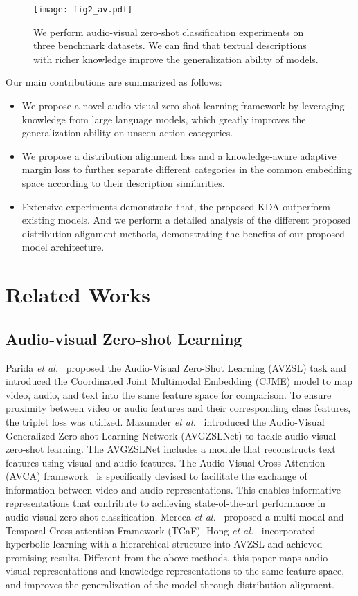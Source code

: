 \documentclass[10pt,twocolumn,letterpaper]{article}
\begin{document}
\begin{figure}[t]
\centering
\texttt{[image: fig2\_av.pdf]}
	\caption{We perform audio-visual zero-shot classification experiments on three benchmark datasets. We can find that textual descriptions with richer knowledge improve the generalization ability of models.}
	\label{fig2}
\end{figure}

Our main contributions are summarized as follows:
\begin{itemize}
    \item We propose a novel audio-visual zero-shot learning framework by leveraging knowledge from large language models, which greatly improves the generalization ability on unseen action categories.
    \item We propose a distribution alignment loss and a knowledge-aware adaptive margin loss to further separate different categories in the common embedding space according to their description similarities.
    \item Extensive experiments demonstrate that, the proposed KDA outperform existing models. And we perform a detailed analysis of the different proposed distribution alignment methods, demonstrating the benefits of our proposed model architecture.
    
\end{itemize}




\section{Related Works}
\subsection{Audio-visual Zero-shot Learning}
Parida \textit{et al.}~\cite{CJME} proposed the Audio-Visual Zero-Shot Learning (AVZSL) task and introduced the Coordinated Joint Multimodal Embedding (CJME) model to map video, audio, and text into the same feature space for comparison. To ensure proximity between video or audio features and their corresponding class features, the triplet loss was utilized.
Mazumder \textit{et al.}~\cite{AVGZSLNet} introduced the Audio-Visual Generalized Zero-shot Learning Network (AVGZSLNet) to tackle audio-visual zero-shot learning. The AVGZSLNet includes a module that reconstructs text features using visual and audio features.
The Audio-Visual Cross-Attention (AVCA) framework~\cite{AVCA} is specifically devised to facilitate the exchange of information between video and audio representations. This enables informative representations that contribute to achieving state-of-the-art performance in audio-visual zero-shot classification.
Mercea \textit{et al.}~\cite{TCaF} proposed a multi-modal and Temporal Cross-attention Framework (TCaF).
Hong \textit{et al.}~\cite{HyperbolicAV} incorporated hyperbolic learning with a hierarchical structure into AVZSL and achieved promising results.
Different from the above methods, this paper maps audio-visual representations and knowledge representations to the same feature space, and improves the generalization of the model through distribution alignment.
\end{document}
